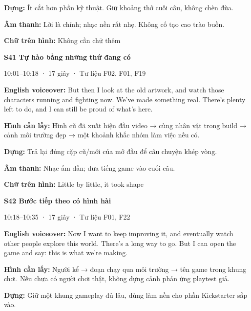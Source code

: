 \documentclass[10pt,a4paper]{article}
\begin{document}
\textbf{Dựng:}  Ít cắt hơn phần kỹ thuật. Giữ khoảng thở cuối câu, không chèn đùa.\par

\textbf{Âm thanh:}  Lời là chính; nhạc nền rất nhẹ. Không cố tạo cao trào buồn.\par

\textbf{Chữ trên hình:}  Không cần chữ thêm\par

\textbf{S41 Tự hào bằng những thứ đang có}\par

10:01–10:18 · 17 giây · Tư liệu F02, F01, F19\par

\textbf{English voiceover:}  But then I look at the old artwork, and watch those characters running and fighting now. We’ve made something real. There’s plenty left to do, and I can still be proud of what’s here.\par

\textbf{Hình cần lấy:}  Hình cũ đã xuất hiện đầu video → cùng nhân vật trong build → cảnh môi trường đẹp → một khoảnh khắc nhóm làm việc nếu có.\par

\textbf{Dựng:}  Trả lại đúng cặp cũ/mới của mở đầu để câu chuyện khép vòng.\par

\textbf{Âm thanh:}  Nhạc ấm dần; đưa tiếng game vào cuối câu.\par

\textbf{Chữ trên hình:}  Little by little, it took shape\par

\textbf{S42 Bước tiếp theo có hình hài}\par

10:18–10:35 · 17 giây · Tư liệu F01, F22\par

\textbf{English voiceover:}  Now I want to keep improving it, and eventually watch other people explore this world. There’s a long way to go. But I can open the game and say: this is what we’re making.\par

\textbf{Hình cần lấy:}  Người kể → đoạn chạy qua môi trường → tên game trong khung chơi. Nếu chưa có người chơi thật, không dựng cảnh phản ứng playtest giả.\par

\textbf{Dựng:}  Giữ một khung gameplay đủ lâu, dùng làm nền cho phần Kickstarter sắp vào.\par
\end{document}
